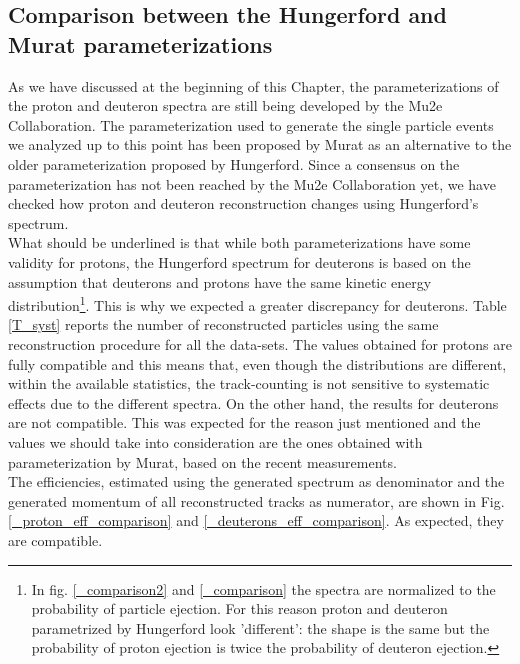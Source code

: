 \documentclass[12pt,a4paper,openright, oneside, titlepage]{book} %
\begin{document}
\subsection{Comparison between the Hungerford and Murat parameterizations}
As we have discussed at the beginning of this Chapter, 
the parameterizations of the proton and deuteron spectra are still being developed
by the Mu2e Collaboration. 
The parameterization used to generate the single particle events 
we analyzed up to this point has been proposed by Murat 
as an alternative to the older parameterization proposed by Hungerford. 
Since a consensus on the parameterization
has not been reached by the Mu2e Collaboration yet, 
we have checked how proton and deuteron reconstruction changes using Hungerford's spectrum.\\
What should be underlined is that while both parameterizations have some validity for protons, 
the Hungerford spectrum for deuterons is based on the assumption that 
deuterons and protons have the same kinetic energy distribution\footnote{In fig. \ref{_comparison2} and \ref{_comparison} the spectra are normalized to the probability of particle ejection. For this reason proton and deuteron parametrized by Hungerford look 'different': the shape is the same but the probability of proton ejection is twice the probability of deuteron ejection.}. 
This is why we expected a greater discrepancy for deuterons. 
Table \ref{T_syst} reports the number of reconstructed particles 
using the same reconstruction procedure for all the data-sets. 
The values obtained for protons are fully compatible and this means that, 
even though the distributions are different, 
within the available statistics, 
the track-counting is not sensitive to systematic effects due 
to the different spectra.
On the other hand, the results for deuterons are not compatible. 
This was expected for the reason just mentioned 
and the values we should take into consideration are the ones
obtained with parameterization by Murat, based on the recent measurements.\\
The efficiencies, estimated using the generated spectrum as denominator
and the generated momentum of all reconstructed tracks as numerator, 
are shown in Fig. \ref{_proton_eff_comparison} and \ref{_deuterons_eff_comparison}. 
As expected, they are compatible.
\end{document}
